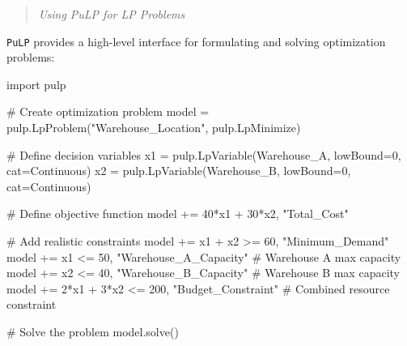 \documentclass[
  letterpaper,
  DIV=11,
  numbers=noendperiod]{scrreprt}
\newenvironment{Shaded}{\begin{snugshade}}{\end{snugshade}}
\newcommand{\CommentTok}[1]{\textcolor[rgb]{0.37,0.37,0.37}{#1}}
\newcommand{\DecValTok}[1]{\textcolor[rgb]{0.68,0.00,0.00}{#1}}
\newcommand{\ImportTok}[1]{\textcolor[rgb]{0.00,0.46,0.62}{#1}}
\newcommand{\NormalTok}[1]{\textcolor[rgb]{0.00,0.23,0.31}{#1}}
\newcommand{\OperatorTok}[1]{\textcolor[rgb]{0.37,0.37,0.37}{#1}}
\newcommand{\StringTok}[1]{\textcolor[rgb]{0.13,0.47,0.30}{#1}}
\begin{document}
\begin{quote}
\emph{Using PuLP for LP Problems}
\end{quote}

\texttt{PuLP} provides a high-level interface for formulating and
solving optimization problems:

\begin{Shaded}
\begin{Highlighting}[]
\ImportTok{import}\NormalTok{ pulp}

\CommentTok{\# Create optimization problem}
\NormalTok{model }\OperatorTok{=}\NormalTok{ pulp.LpProblem(}\StringTok{"Warehouse\_Location"}\NormalTok{, pulp.LpMinimize)}

\CommentTok{\# Define decision variables}
\NormalTok{x1 }\OperatorTok{=}\NormalTok{ pulp.LpVariable(}\StringTok{\textquotesingle{}Warehouse\_A\textquotesingle{}}\NormalTok{, lowBound}\OperatorTok{=}\DecValTok{0}\NormalTok{, cat}\OperatorTok{=}\StringTok{\textquotesingle{}Continuous\textquotesingle{}}\NormalTok{)}
\NormalTok{x2 }\OperatorTok{=}\NormalTok{ pulp.LpVariable(}\StringTok{\textquotesingle{}Warehouse\_B\textquotesingle{}}\NormalTok{, lowBound}\OperatorTok{=}\DecValTok{0}\NormalTok{, cat}\OperatorTok{=}\StringTok{\textquotesingle{}Continuous\textquotesingle{}}\NormalTok{)}

\CommentTok{\# Define objective function}
\NormalTok{model }\OperatorTok{+=} \DecValTok{40}\OperatorTok{*}\NormalTok{x1 }\OperatorTok{+} \DecValTok{30}\OperatorTok{*}\NormalTok{x2, }\StringTok{"Total\_Cost"}

\CommentTok{\# Add realistic constraints}
\NormalTok{model }\OperatorTok{+=}\NormalTok{ x1 }\OperatorTok{+}\NormalTok{ x2 }\OperatorTok{\textgreater{}=} \DecValTok{60}\NormalTok{, }\StringTok{"Minimum\_Demand"}
\NormalTok{model }\OperatorTok{+=}\NormalTok{ x1 }\OperatorTok{\textless{}=} \DecValTok{50}\NormalTok{, }\StringTok{"Warehouse\_A\_Capacity"}  \CommentTok{\# Warehouse A max capacity}
\NormalTok{model }\OperatorTok{+=}\NormalTok{ x2 }\OperatorTok{\textless{}=} \DecValTok{40}\NormalTok{, }\StringTok{"Warehouse\_B\_Capacity"}  \CommentTok{\# Warehouse B max capacity}
\NormalTok{model }\OperatorTok{+=} \DecValTok{2}\OperatorTok{*}\NormalTok{x1 }\OperatorTok{+} \DecValTok{3}\OperatorTok{*}\NormalTok{x2 }\OperatorTok{\textless{}=} \DecValTok{200}\NormalTok{, }\StringTok{"Budget\_Constraint"}  \CommentTok{\# Combined resource constraint}

\CommentTok{\# Solve the problem}
\NormalTok{model.solve()}


\end{Highlighting}
\end{Shaded}
\end{document}
